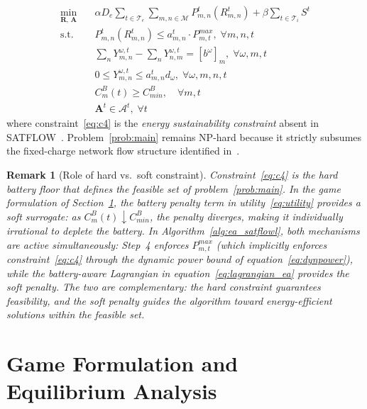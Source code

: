\documentclass[journal]{IEEEtran}
\newtheorem{remark}{Remark}
\newcommand{\CB}{C^{B}}
\newcommand{\CBmin}{C^{B}_{min}}
\newcommand{\calM}{\mathcal{M}}
\newcommand{\bfR}{\mathbf{R}}
\newcommand{\Rmn}{R_{m,n}^{t}}
\begin{document}
\begin{subequations}
\label{prob:main}
\begin{align}
    \min_{\bfR,\,\mathbf{A}} \quad &
    \alpha D_e \sum_{t\in\mathcal{T}_e}
    \sum_{m,n\in\calM} P_{m,n}^t\!\left(\Rmn\right)
    + \beta\sum_{t\in\mathcal{T}_i} S^t
    \label{eq:obj}\\
    \text{s.t.} \quad &
    P_{m,n}^t\!\left(\Rmn\right) \leq
    a_{m,n}^t \cdot P_{m,t}^{max},
    \;\forall m,n,t
    \label{eq:c1}\\
    & \sum_{n} Y_{m,n}^{\omega,t} -
    \sum_{n} Y_{n,m}^{\omega,t} = [b^\omega]_m,
    \;\forall\omega,m,t
    \label{eq:c2}\\
    & 0\leq Y_{m,n}^{\omega,t} \leq
    a_{m,n}^t d_\omega,
    \;\forall\omega,m,n,t
    \label{eq:c3}\\
    & \CB_m(t) \geq \CBmin, \quad\forall m,t
    \label{eq:c4}\\
    & \mathbf{A}^t \in \mathscr{A}^t,
    \;\forall t
    \label{eq:c5}
\end{align}
\end{subequations}
where constraint~\eqref{eq:c4} is the \emph{energy sustainability constraint} absent in SATFLOW~\cite{cen2024satflow}. Problem~\eqref{prob:main} remains NP-hard because it strictly subsumes the fixed-charge network flow structure identified in~\cite{cen2024satflow}.

\begin{remark}[Role of hard vs.\ soft constraint]
\label{rem:hard_soft}
Constraint~\eqref{eq:c4} is the \emph{hard} battery floor that defines the feasible set of problem~\eqref{prob:main}. In the game formulation of Section~\ref{sec:game}, the battery penalty term in utility~\eqref{eq:utility} provides a \emph{soft} surrogate: as $\CB_m(t)\downarrow\CBmin$, the penalty diverges, making it individually irrational to deplete the battery. In Algorithm~\ref{alg:ea_satflowl}, both mechanisms are active simultaneously: Step~4 enforces $P_{m,t}^{max}$ (which implicitly enforces constraint~\eqref{eq:c4} through the dynamic power bound of equation~\eqref{eq:dynpower}), while the battery-aware Lagrangian in equation~\eqref{eq:lagrangian_ea} provides the soft penalty. The two are complementary: the hard constraint guarantees feasibility, and the soft penalty guides the algorithm toward energy-efficient solutions within the feasible set.
\end{remark}

\section{Game Formulation and Equilibrium Analysis}
\label{sec:game}
\end{document}
